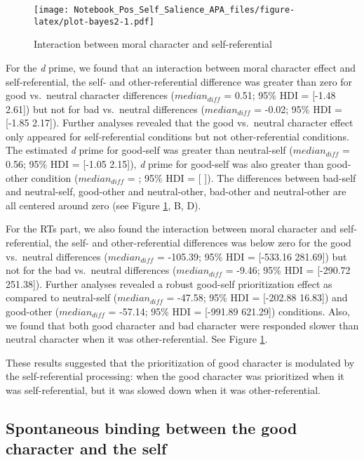 \documentclass[
  man]{apa6}
\begin{document}
\begin{figure}
\centering
\texttt{[image: Notebook\_Pos\_Self\_Salience\_APA\_files/figure-latex/plot-bayes2-1.pdf]}
\caption{\label{fig:plot-bayes2}Interaction between moral character and self-referential}
\end{figure}

For the \emph{d} prime, we found that an interaction between moral character effect and self-referential, the self- and other-referential difference was greater than zero for good vs.~neutral character differences (\(median_{diff}\) = 0.51; 95\% HDI = {[}-1.48 2.61{]}) but not for bad vs.~neutral differences (\(median_{diff}\) = -0.02; 95\% HDI = {[}-1.85 2.17{]}). Further analyses revealed that the good vs.~neutral character effect only appeared for self-referential conditions but not other-referential conditions. The estimated \emph{d} prime for good-self was greater than neutral-self (\(median_{diff}\) = 0.56; 95\% HDI = {[}-1.05 2.15{]}), \emph{d} prime for good-self was also greater than good-other condition (\(median_{diff}\) = ; 95\% HDI = {[} {]}). The differences between bad-self and neutral-self, good-other and neutral-other, bad-other and neutral-other are all centered around zero (see Figure \ref{fig:plot-bayes2}, B, D).

For the RTs part, we also found the interaction between moral character and self-referential, the self- and other-referential differences was below zero for the good vs.~neutral differences (\(median_{diff}\) = -105.39; 95\% HDI = {[}-533.16 281.69{]}) but not for the bad vs.~neutral differences (\(median_{diff}\) = -9.46; 95\% HDI = {[}-290.72 251.38{]}). Further analyses revealed a robust good-self prioritization effect as compared to neutral-self (\(median_{diff}\) = -47.58; 95\% HDI = {[}-202.88 16.83{]}) and good-other (\(median_{diff}\) = -57.14; 95\% HDI = {[}-991.89 621.29{]}) conditions. Also, we found that both good character and bad character were responded slower than neutral character when it was other-referential. See Figure \ref{fig:plot-bayes2}.

These results suggested that the prioritization of good character is modulated by the self-referential processing: when the good character was prioritized when it was self-referential, but it was slowed down when it was other-referential.

\hypertarget{spontaneous-binding-between-the-good-character-and-the-self}{%
\subsection{Spontaneous binding between the good character and the self}\label{spontaneous-binding-between-the-good-character-and-the-self}}
\end{document}

